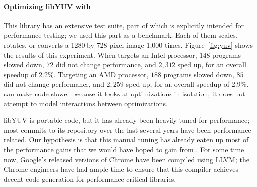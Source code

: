 \paragraph{Optimizing libYUV with \tool{}}


\begin{figure*}[tbp]
  \centering
  \hfill
  \caption{LibYUV Library speedups}
  \label{fig:yuv}
\end{figure*}


This library has an extensive test suite, part of which is explicitly
intended for performance testing; we used this part as a benchmark.
%
Each of them scales, rotates, or converts a 1280 by 728 pixel
image 1,000 times.
%
Figure~\ref{fig:yuv} shows the results of this experiment.
%
When \tool{} targets an Intel processor, $148$ programs slowed down, $72$
did not change performance, and $2,312$ sped up, for an overall speedup of
2.2\%.
%
Targeting an AMD processor, $188$ programs slowed down, $85$ did not
change performance, and $2,259$ sped up, for an overall speedup of 2.9\%.
%
\tool{} can make code slower because it looks at optimizations in
isolation; it does not attempt to model interactions between
optimizations.


libYUV is portable code, but it has already been heavily tuned for
performance; most commits to its repository over the last several
years have been performance-related.
%
Our hypothesis is that this manual tuning has already eaten up most of
the performance gains that we would have hoped to gain from \tool{}.
%
For some time now, Google's released versions of Chrome have been
compiled using LLVM; the Chrome engineers have had ample time to
ensure that this compiler achieves decent code generation for
performance-critical libraries.

\begin{figure*}[tbp]
  \centering
  \hfill
  \caption*{Targeting Intel Cascade Lake\label{fig:spec-intel}}
  \hfill
  \hfill
  \caption*{Targeting AMD Zen 3\label{fig:spec-amd}}
  \caption{SPEC CPU2017 integer benchmark performance and compilation time}
  \label{fig:spec}
\end{figure*}


